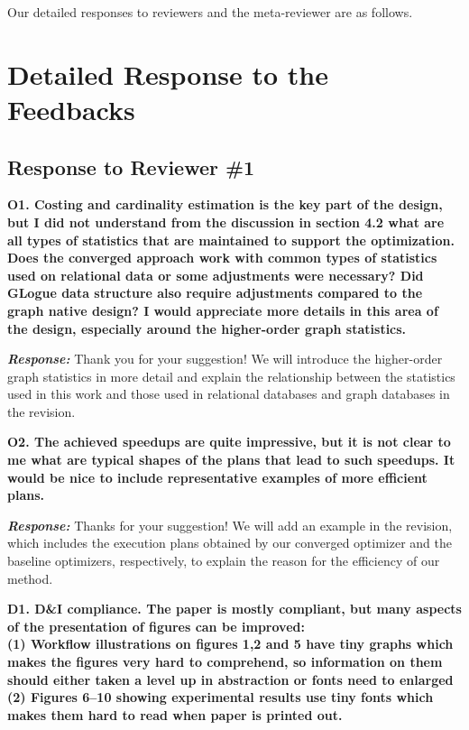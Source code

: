 Our detailed responses to reviewers and the meta-reviewer are as follows.


\section{Detailed Response to the Feedbacks}
\subsection{Response to Reviewer \#1}

\textbf{O1. Costing and cardinality estimation is the key part of the design, but I did not understand from the discussion in section 4.2 what are all types of statistics that are maintained to support the optimization. Does the converged approach work with common types of statistics used on relational data or some adjustments were necessary? Did GLogue data structure also require adjustments compared to the graph native design? I would appreciate more details in this area of the design, especially around the higher-order graph statistics.}

\begin{mdframed}[linewidth=0.5pt, linecolor=black]
\textbf{\textit{Response: }}
Thank you for your suggestion! We will introduce the higher-order graph statistics in more detail and explain the relationship between the statistics used in this work and those used in relational databases and graph databases in the revision.
\end{mdframed}



\textbf{O2. The achieved speedups are quite impressive, but it is not clear to me what are typical shapes of the plans that lead to such speedups. It would be nice to include representative examples of more efficient plans.}

\textbf{\textit{Response: }}
Thanks for your suggestion! We will add an example in the revision, which includes the execution plans obtained by our converged optimizer and the baseline optimizers, respectively, to explain the reason for the efficiency of our method.

\textbf{D1. D\&I compliance. 
The paper is mostly compliant, but many aspects of the presentation of figures can be improved: \\
(1) Workflow illustrations on figures 1,2 and 5 have tiny graphs which makes the figures very hard to comprehend, so information on them should either taken a level up in abstraction or fonts need to enlarged \\
(2) Figures 6--10 showing experimental results use tiny fonts which makes them hard to read when paper is printed out.}

